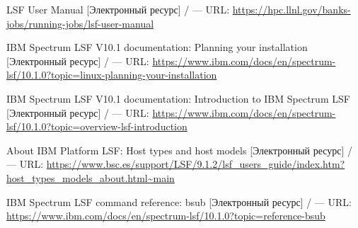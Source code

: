 \begingroup 
\renewcommand{\section}[2]{\anonsection{Список использованных источников и литературы}}
\begin{thebibliography}{00}




    LSF User Manual
    [Электронный ресурс] /
    --- URL: \url{https://hpc.llnl.gov/banks-jobs/running-jobs/lsf-user-manual}

    IBM Spectrum LSF V10.1 documentation: Planning your installation
    [Электронный ресурс] /
    --- URL: \url{https://www.ibm.com/docs/en/spectrum-lsf/10.1.0?topic=linux-planning-your-installation}

    IBM Spectrum LSF V10.1 documentation: Introduction to IBM Spectrum LSF
    [Электронный ресурс] /
    --- URL: \url{https://www.ibm.com/docs/en/spectrum-lsf/10.1.0?topic=overview-lsf-introduction}

    About IBM Platform LSF: Host types and host models
    [Электронный ресурс] /
    --- URL: \url{https://www.bsc.es/support/LSF/9.1.2/lsf_users_guide/index.htm?host_types_models_about.html~main}

    IBM Spectrum LSF command reference: bsub
    [Электронный ресурс] /
    --- URL: \url{https://www.ibm.com/docs/en/spectrum-lsf/10.1.0?topic=reference-bsub}


\end{thebibliography}
\endgroup

\clearpage
